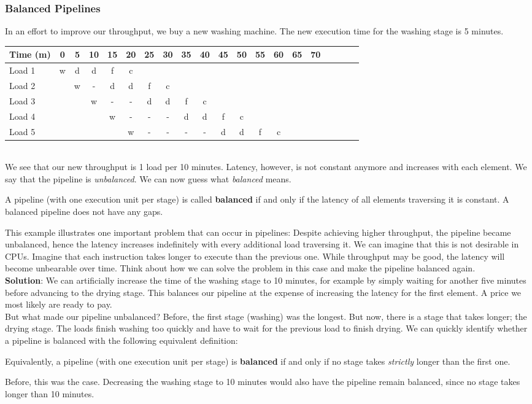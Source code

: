 \documentclass[main.tex]{subfiles}
\begin{document}
\subsubsection{Balanced Pipelines}
In an effort to improve our throughput, we buy a new washing machine. The new execution time for the washing stage is 5 minutes.\\[3mm]
\begin{tabular}{l | *{19}{c}}
    Time (m) & 0 & 5 & 10 & 15 & 20 & 25 & 30 & 35 & 40 & 45 & 50 & 55 & 60 & 65 & 70\\
    \hline
    Load 1 & w & d & d & f & c\\
    Load 2 &   & w & - & d & d & f & c\\
    Load 3 &   &   & w & - & - & d & d & f & c \\
    Load 4 &   &   &   & w & - & - & - & d & d & f & c \\
    Load 5 &   &   &   &   & w & - & - & - & - & d & d & f & c
\end{tabular} \\[3mm]
\noindent We see that our new throughput is 1 load per 10 minutes. Latency, however, is not constant anymore and increases with each element. We say that the pipeline is \textit{unbalanced}. We can now guess what \textit{balanced} means.
\begin{definition}
  A pipeline (with one execution unit per stage) is called \textbf{balanced} if and only if the latency of all elements traversing it is constant. A balanced pipeline does not have any gaps.
\end{definition}
This example illustrates one important problem that can occur in pipelines: Despite achieving higher throughput, the pipeline became unbalanced, hence the latency increases indefinitely with every additional load traversing it. We can imagine that this is not desirable in CPUs. Imagine that each instruction takes longer to execute than the previous one. While throughput may be good, the latency will become unbearable over time. Think about how we can solve the problem in this case and make the pipeline balanced again.\\[3mm]
\textbf{Solution}: We can artificially increase the time of the washing stage to 10 minutes, for example by simply waiting for another five minutes before advancing to the drying stage. This balances our pipeline at the expense of increasing the latency for the first element. A price we most likely are ready to pay.\\[3mm]
But what made our pipeline unbalanced? Before, the first stage (washing) was the longest. But now, there is a stage that takes longer; the drying stage. The loads finish washing too quickly and have to wait for the previous load to finish drying. We can quickly identify whether a pipeline is balanced with the following equivalent definition:
\begin{definition}
  Equivalently, a pipeline (with one execution unit per stage) is \textbf{balanced} if and only if no stage takes \textit{strictly} longer than the first one.
\end{definition}
Before, this was the case. Decreasing the washing stage to 10 minutes would also have the pipeline remain balanced, since no stage takes longer than 10 minutes.
\end{document}
